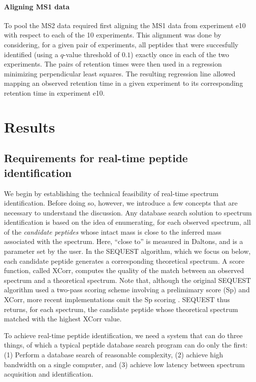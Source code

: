 \documentclass[12pt]{article}
\begin{document}
\paragraph{Aligning MS1 data}
To pool the MS2 data required first aligning the MS1 data from
experiment e10 with respect to each of the 10 experiments.  This
alignment was done by considering, for a given pair of experiments, all
peptides that were succesfully identified (using a $q$-value threshold
of $0.1$) exactly once in each of the two experiments. The
pairs of retention times were then used in a regression minimizing
perpendicular least squares.  The resulting
regression line allowed mapping an observed retention time in a given
experiment to its corresponding retention time in experiment e10.

\section*{Results}

\subsection*{Requirements for real-time peptide identification}
\label{section:lowlatency}

We begin by establishing the technical feasibility of real-time
spectrum identification.  Before doing so, however, we introduce a few
concepts that are necessary to understand the discussion.  Any
database search solution to spectrum identification is based on the
idea of enumerating, for each observed spectrum, all of the {\em
  candidate peptides} whose intact mass is close to the inferred mass
associated with the spectrum.  Here, ``close to'' is measured in
Daltons, and is a parameter set by the user.  In the SEQUEST
algorithm, which we focus on below, each candidate peptide generates a
corresponding theoretical spectrum.  A score function, called XCorr,
computes the quality of the match between an observed spectrum and a
theoretical spectrum.  Note that, although the original SEQUEST
algorithm used a two-pass scoring scheme involving a prelimimary score
(Sp) and XCorr, more recent implementations omit the Sp scoring
\cite{eng:fast}.  SEQUEST thus returns, for each spectrum, the
candidate peptide whose theoretical spectrum matched with the highest
XCorr value.

To achieve real-time peptide identification, we need a system that can
do three things, of which a typical peptide database search program
can do only the first: (1) Perform a database search of reasonable
complexity, (2) achieve high bandwidth on a single computer, and (3)
achieve low latency between spectrum acquisition and identification.
\end{document}
